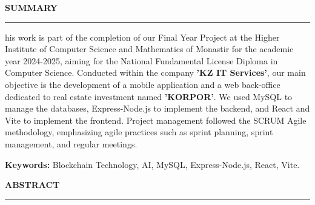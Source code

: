 \thispagestyle{empty} %

\begin{center}
{\color{primary}\Large\textbf{\MakeUppercase{Summary}}}
\end{center}
\vspace{0.1cm}
\begin{center}
\rule{0.6\textwidth}{1pt}
\end{center}
\vspace{0.5cm}

\noindent {}his work is part of the completion of our Final Year Project at the Higher Institute of Computer Science and Mathematics of Monastir for the academic year 2024-2025, aiming for the National Fundamental License Diploma in Computer Science. Conducted within the company \textbf{\textcolor{primary}{'KZ IT Services'}}, our main objective is the development of a mobile application and a web back-office dedicated to real estate investment named \textbf{\textcolor{primary}{'KORPOR'}}. We used MySQL to manage the databases, Express-Node.js to implement the backend, and React and Vite to implement the frontend. Project management followed the SCRUM Agile methodology, emphasizing agile practices such as sprint planning, sprint management, and regular meetings.

\vspace{0.3cm}
\begin{tcolorbox}[
    colback=background,
    colframe=primary,
    arc=1mm,
    boxrule=0.5pt,
    left=8pt,
    right=8pt,
    top=4pt,
    bottom=4pt,
    width=\textwidth
]
\textbf{Keywords:} Blockchain Technology, AI, MySQL, Express-Node.js, React, Vite.
\end{tcolorbox}

\vspace{2cm} %



\begin{center}
{\color{primary}\Large\textbf{\MakeUppercase{Abstract}}}
\end{center}
\vspace{0.1cm}
\begin{center}
\rule{0.6\textwidth}{1pt}
\end{center}
\vspace{0.5cm}

